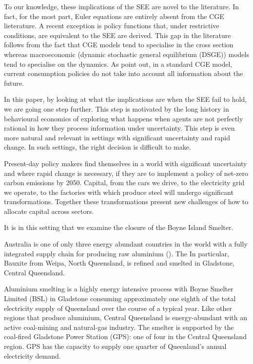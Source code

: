 \documentclass[12pt,a4paper]{article}
\begin{document}
To our knowledge, these implications of the SEE are novel to the literature.
In fact, for the most part, Euler equations are entirely absent from the CGE
lieterature.  A recent exception is \cite{Dixon_Rimmer-Euler} policy functions
that, under restrictive conditions, are equivalent to the SEE are derived.
This gap in the literature follows from the fact that CGE models tend to
specialise in the cross section whereas macroeconomic (dynamic stochastic
general equilibrium (DSGE)) models tend to specialise on the dynamics.  As
\cite{Dixon_Rimmer-Euler} point out, in a standard CGE model, current
consumption policies do not take into account all information about the future.

In this paper, by looking at what the implications are when the SEE fail to
hold, we are going one step further. This step is motivated by the long history
in behavioural economics of exploring what happens when agents are not
perfectly rational in how they process information under uncertainty.  This
step is even more natural and relevant in settings with significant uncertainty
and rapid change. In such settings, the right decision is difficult to make.

Present-day policy makers find themselves in a world with significant
uncertainty and where rapid change is necessary, if they are to implement a
policy of net-zero carbon emissions by 2050. Capital, from the cars we drive,
to the electricity grid we operate, to the factories with which produce steel
will undergo significant transformations. Together these transformations
present new challenges of how to allocate capital across sectors.

It is in this setting that we
examine the closure of the Boyne Island Smelter.

Australia is one of only three energy abundant countries in
the world with a fully integrated supply chain for producing raw aluminium
(\cite{GN-Aluminium-smelters}). The In particular, Bauxite from Weipa, North
Queensland, is refined and smelted in Gladstone, Central Queensland.

Aluminium smelting is a highly energy intensive process with Boyne Smelter
Limited (BSL) in Gladstone consuming approximately one eighth of the total
electricity supply of Queensland over the course of a typical year. Like other
regions that produce aluminium, Central Queensland is energy-abundant with an
active coal-mining and natural-gas industry. The smelter is supported by the
coal-fired Gladstone Power Station (GPS): one of four in the Central
Queensland region. GPS has the capacity to supply one quarter of Queenland's
annual electricity demand.
\end{document}
